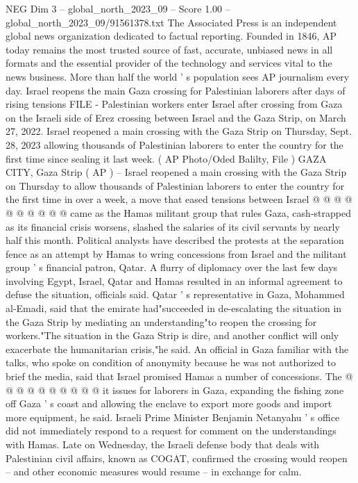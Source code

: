 \begin{textsample}{NEG Dim 3 – global\_north\_2023\_09 – Score 1.00 – global\_north\_2023\_09/91561378.txt}  \label{ex:f3_neg_391}
The Associated Press is an independent global news organization dedicated to factual reporting.
Founded in 1846, AP today remains the most trusted source of fast, accurate, unbiased news in all formats and the essential provider of the technology and services vital to the news business.
More than half the world ' s population sees AP journalism every day.
Israel reopens the main Gaza crossing for Palestinian laborers after days of rising tensions FILE - Palestinian workers enter Israel after crossing from Gaza on the Israeli side of Erez crossing between Israel and the Gaza Strip, on March 27, 2022.
Israel reopened a main crossing with the Gaza Strip on Thursday, Sept. 28, 2023 allowing thousands of Palestinian laborers to enter the country for the first time since sealing it last week. ( AP Photo/Oded Balilty, File ) GAZA CITY, Gaza Strip ( AP ) -- Israel reopened a main crossing with the Gaza Strip on Thursday to allow thousands of Palestinian laborers to enter the country for the first time in over a week, a move that eased tensions between Israel @ @ @ @ @ @ @ @ @ @ came as the Hamas militant group that rules Gaza, cash-strapped as its financial crisis worsens, slashed the salaries of its civil servants by nearly half this month.
Political analysts have described the protests at the separation fence as an attempt by Hamas to wring concessions from Israel and the militant group ' s financial patron, Qatar.
A flurry of diplomacy over the last few days involving Egypt, Israel, Qatar and Hamas resulted in an informal agreement to defuse the situation, officials said.
Qatar ' s representative in Gaza, Mohammed al-Emadi, said that the emirate had"succeeded in de-escalating the situation in the Gaza Strip by mediating an understanding"to reopen the crossing for workers."The situation in the Gaza Strip is dire, and another conflict will only exacerbate the humanitarian crisis,"he said.
An official in Gaza familiar with the talks, who spoke on condition of anonymity because he was not authorized to brief the media, said that Israel promised Hamas a number of concessions.
The @ @ @ @ @ @ @ @ @ @ it issues for laborers in Gaza, expanding the fishing zone off Gaza ' s coast and allowing the enclave to export more goods and import more equipment, he said.
Israeli Prime Minister Benjamin Netanyahu ' s office did not immediately respond to a request for comment on the understandings with Hamas.
Late on Wednesday, the Israeli defense body that deals with Palestinian civil affairs, known as COGAT, confirmed the crossing would reopen -- and other economic measures would resume -- in exchange for calm.

\end{textsample}
